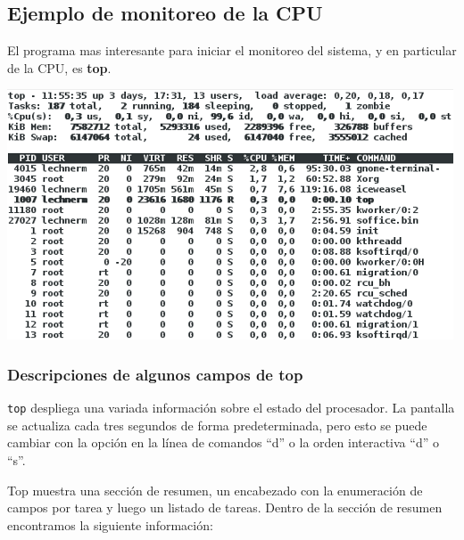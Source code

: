 \documentclass[12pt]{article}
\begin{document}
\subsection*{Ejemplo de monitoreo de la CPU}

El programa mas interesante para iniciar el monitoreo del sistema, y en 
particular de la CPU, es \textbf{top}.


\begin{center}
 \includegraphics{top.png}
\end{center}

\subsubsection*{Descripciones de algunos campos de top}
\texttt{top} despliega  una variada información sobre el estado del 
procesador. La pantalla se actualiza cada tres segundos de forma 
predeterminada, pero esto se puede cambiar con la opción en la línea de 
comandos ``d'' o la orden interactiva ``d'' o ``s''.

Top muestra una sección de resumen, un encabezado con la enumeración de
campos por tarea y luego un listado de tareas. Dentro de la sección de
resumen encontramos la siguiente información:  
\end{document}
